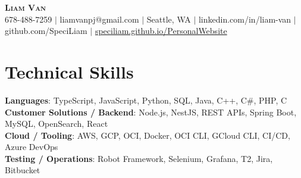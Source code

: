 \documentclass[letterpaper,11pt]{article}
\begin{document}

%
\begin{center}
    \textbf{\Huge \scshape Liam Van} \\ \vspace{1pt}
    \small 678-488-7259 $|$ \small {liamvanpj@gmail.com} $|$ Seattle, WA
 {{$|$ linkedin.com/in/liam-van} {$|$ github.com/SpeciLiam} {$|$ \href{https://speciliam.github.io/PersonalWebsite}{speciliam.github.io/PersonalWebsite}}}

\end{center}

\section{Technical Skills}
 \begin{itemize}[leftmargin=0.15in, label={}]
    \small{\item{
     \textbf{Languages}{: TypeScript, JavaScript, Python, SQL, Java, C++, C\#, PHP, C} \\
     \textbf{Customer Solutions / Backend}{: Node.js, NestJS, REST APIs, Spring Boot, MySQL, OpenSearch, React} \\
     \textbf{Cloud / Tooling}{: AWS, GCP, OCI, Docker, OCI CLI, GCloud CLI, CI/CD, Azure DevOps} \\
     \textbf{Testing / Operations}{: Robot Framework, Selenium, Grafana, T2, Jira, Bitbucket} \\
    }}
 \end{itemize}
%
\end{document}
